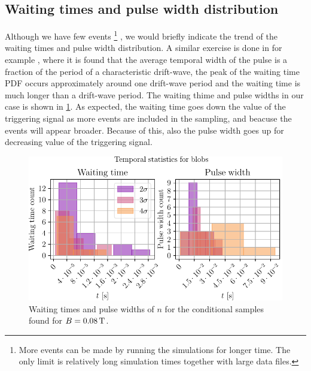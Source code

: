 \subsection{Waiting times and pulse width distribution}
%
Although we have few events
%
\footnote{
    More events can be made by running the simulations for longer time.
    The only limit is relatively long simulation times together with large data files.
}
%
, we would briefly indicate the trend of the waiting times and pulse width distribution.
A similar exercise is done in for example \cite{Hornung2011}, where it is found that the average temporal width of the pulse is a fraction of the period of a characteristic drift-wave, the peak of the waiting time PDF occurs approximately around one drift-wave period and the waiting time is much longer than a drift-wave period.
The waiting thime and pulse widths in our case is shown in \cref{fig:tempStatBlob}.
As expected, the waiting time goes down the value of the triggering signal as more events are included in the sampling, and beacuse the events will appear broader.
Because of this, also the pulse width goes up for decreasing value of the triggering signal.
%
\begin{figure}[h!]
    \begin{center}
        \includegraphics{fig/results/blobs/blobStatsB0_008Tweak}
    \end{center}
    \caption{
        Waiting times and pulse widths of $n$ for the conditional samples found for $B=0.08\, \text{T}$.
    }
    \label{fig:tempStatBlob}
\end{figure}
